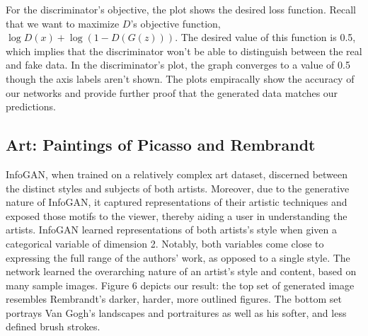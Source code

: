 \documentclass[conference,11pt]{IEEEtran}
\begin{document}
For the discriminator's objective, the plot shows the desired loss function.  Recall that we want to maximize $D$'s objective function, $\log D(x) + \log (1-D(G(z)))$. The desired value of this function is 0.5, which implies that the discriminator won't be able to distinguish between the real and fake data.  In the discriminator's plot, the graph converges to a value of 0.5 though the axis labels aren't shown.  The plots empiracally show the accuracy of our networks and provide further proof that the generated data matches our predictions.

\begin{table}[h]
\centering
\caption{Hyperparameters for Politician Dataset}
\end{table}

\subsection{Art: Paintings of Picasso and Rembrandt}

InfoGAN, when trained on a relatively complex art dataset, discerned between the distinct styles and subjects of both artists.  Moreover, due to the generative nature of InfoGAN, it captured representations of their artistic techniques and exposed those motifs to the viewer, thereby aiding a user in understanding the artists.  InfoGAN learned representations of both artists's style when given a categorical variable of dimension 2.  Notably, both variables come close to expressing the full range of the authors' work, as opposed to a single style.  The network learned the overarching nature of an artist's style and content, based on many sample images.  Figure 6 depicts our result: the top set of generated image resembles Rembrandt's darker, harder, more outlined figures.  The bottom set portrays Van Gogh's landscapes and portraitures as well as his softer, and less defined brush strokes. 
\end{document}
